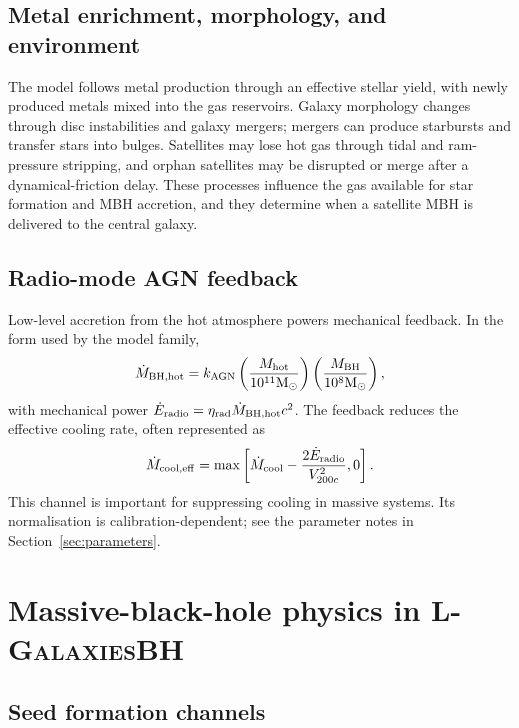 \documentclass[11pt,a4paper]{article}
\newcommand{\Msun}{\mathrm{M}_{\odot}}
\newcommand{\Lgalbh}{\textsc{L-GalaxiesBH}}
\begin{document}
\subsection{Metal enrichment, morphology, and environment}

The model follows metal production through an effective stellar yield, with newly produced metals mixed into the gas reservoirs. Galaxy morphology changes through disc instabilities and galaxy mergers; mergers can produce starbursts and transfer stars into bulges. Satellites may lose hot gas through tidal and ram-pressure stripping, and orphan satellites may be disrupted or merge after a dynamical-friction delay. These processes influence the gas available for star formation and MBH accretion, and they determine when a satellite MBH is delivered to the central galaxy.

\subsection{Radio-mode AGN feedback}

Low-level accretion from the hot atmosphere powers mechanical feedback. In the form used by the model family,
\begin{equation}
 \dot M_{\rm BH,hot}=k_{\rm AGN}
 \left(\frac{M_{\rm hot}}{10^{11}\Msun}\right)
 \left(\frac{M_{\rm BH}}{10^8\Msun}\right),
\end{equation}
with mechanical power $\dot E_{\rm radio}=\eta_{\rm rad}\dot M_{\rm BH,hot}c^2$. The feedback reduces the effective cooling rate, often represented as
\begin{equation}
 \dot M_{\rm cool,eff}=\max\left[\dot M_{\rm cool}-
 \frac{2\dot E_{\rm radio}}{V_{200c}^2},0\right].
\end{equation}
This channel is important for suppressing cooling in massive systems. Its normalisation is calibration-dependent; see the parameter notes in Section~\ref{sec:parameters}.

\section{Massive-black-hole physics in \Lgalbh}

\subsection{Seed formation channels}
\end{document}
